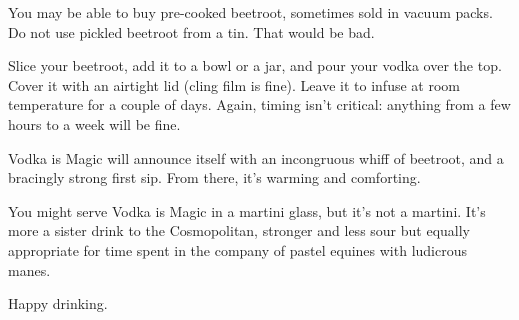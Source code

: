 You may be able to buy pre-cooked beetroot, sometimes sold in vacuum packs. Do not use pickled beetroot from a tin. That would be bad.

Slice your beetroot, add it to a bowl or a jar, and pour your vodka over the top. Cover it with an airtight lid (cling film is fine). Leave it to infuse at room temperature for a couple of days. Again, timing isn’t critical: anything from a few hours to a week will be fine.

\secdiv

Vodka is Magic will announce itself with an incongruous whiff of beetroot, and a bracingly strong first sip. From there, it’s warming and comforting.

You might serve Vodka is Magic in a martini glass, but it’s not a martini. It’s more a sister drink to the Cosmopolitan, stronger and less sour but equally appropriate for time spent in the company of pastel equines with ludicrous manes.

Happy drinking.
